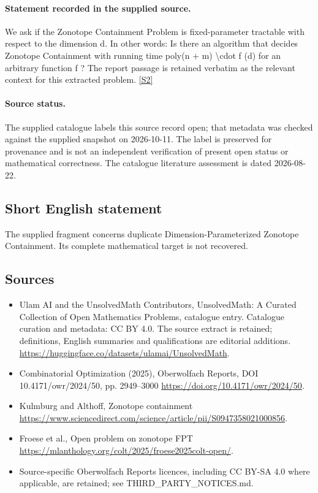 \documentclass[11pt]{article}
\newcommand{\sref}[2]{\hyperlink{source:#1:#2}{[S#2]}}
\begin{document}
\paragraph{Statement recorded in the supplied source.}
We ask if the Zonotope Containment Problem is fixed-parameter tractable with respect to the dimension d. In other words: Is there an algorithm that decides Zonotope Containment with running time poly(n + m) \textbackslash{}cdot f (d) for an arbitrary function f ? The report passage is retained verbatim as the relevant context for this extracted problem. \sref{statement}{2}
\paragraph{Source status.}
The supplied catalogue labels this source record open; that metadata was checked against the supplied snapshot on 2026-10-11. The label is preserved for provenance and is not an independent verification of present open status or mathematical correctness. The catalogue literature assessment is dated 2026-08-22.
\subsection{Short English statement}
The supplied fragment concerns duplicate Dimension-Parameterized Zonotope Containment. Its complete mathematical target is not recovered.
\subsection{Sources}
\begin{itemize}
\item[\hypertarget{source:statement:1}{S1}] Ulam AI and the UnsolvedMath Contributors, UnsolvedMath: A Curated Collection of Open Mathematics Problems, catalogue entry. Catalogue curation and metadata: CC BY 4.0. The source extract is retained; definitions, English summaries and qualifications are editorial additions.
\url{https://huggingface.co/datasets/ulamai/UnsolvedMath}.
\item[\hypertarget{source:statement:2}{S2}] Combinatorial Optimization (2025), Oberwolfach Reports, DOI 10.4171/owr/2024/50, pp. 2949--3000
\url{https://doi.org/10.4171/owr/2024/50}.
\item[\hypertarget{source:statement:3}{S3}] Kulmburg and Althoff, Zonotope containment
\url{https://www.sciencedirect.com/science/article/pii/S0947358021000856}.
\item[\hypertarget{source:statement:4}{S4}] Froese et al., Open problem on zonotope FPT
\url{https://mlanthology.org/colt/2025/froese2025colt-open/}.
\item Source-specific Oberwolfach Reports licences, including CC BY-SA 4.0 where applicable, are retained; see THIRD\_PARTY\_NOTICES.md.
\end{itemize}
\end{document}
